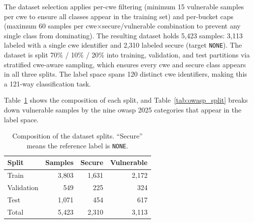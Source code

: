 The dataset selection applies per-\gls{cwe} filtering (minimum 15 vulnerable samples per \gls{cwe} to ensure all classes appear in the training set) and per-bucket caps (maximum 60 samples per \gls{cwe}$\times$secure/vulnerable combination to prevent any single class from dominating). The resulting dataset holds 5{,}423 samples: 3{,}113 labeled with a single \gls{cwe} identifier and 2{,}310 labeled secure (target \texttt{NONE}). The dataset is split 70\% / 10\% / 20\% into training, validation, and test partitions via stratified \gls{cwe}-aware sampling, which ensures every \gls{cwe} and secure class appears in all three splits. The label space spans 120 distinct \gls{cwe} identifiers, making this a 121-way classification task.

Table~\ref{tab:split_composition} shows the composition of each split, and Table~\ref{tab:owasp_split} breaks down vulnerable samples by the nine \gls{owasp} 2025 categories that appear in the label space.

\begin{table}[H]
\centering
\caption{Composition of the dataset splits. ``Secure'' means the reference
label is \texttt{NONE}.}
\label{tab:split_composition}
\footnotesize
\begin{tabular}{l r r r}
\toprule
\textbf{Split} & \textbf{Samples} & \textbf{Secure} & \textbf{Vulnerable} \\
\midrule
Train      & 3{,}803 & 1{,}631 & 2{,}172 \\
Validation &   549 &   225 &   324 \\
Test       & 1{,}071 &   454 &   617 \\
\midrule
Total      & 5{,}423 & 2{,}310 & 3{,}113 \\
\bottomrule
\end{tabular}
\end{table}

